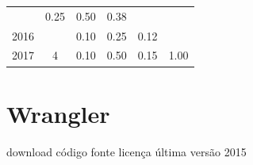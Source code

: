 \begin{table}[H]
\begin{tabular}{| l | c | c | c | c | c |}
          &
          0.25
          &
          0.50
          &
          0.38
          &
          \\
            2016
          &
          
          &
          0.10
          &
          0.25
          &
          0.12
          &
          \\
\hline
            2017
          &
          4
          &
          0.10
          &
          0.50
          &
          0.15
          &
            {\color{blue} 1.00}
          \\
\hline
\end{tabular}
\end{table}



\section{Wrangler}
\checkmark download
\checkmark código fonte
\checkmark licença
\checkmark última versão 2015


